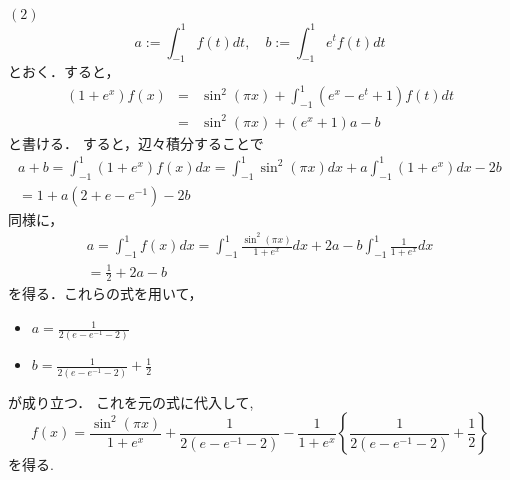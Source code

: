 \documentclass[main]{subfiles}
\begin{document}
\begin{pf}
$(2)$
\begin{equation*}
a := \int^1_{-1}f(t)dt, \quad b := \int^1_{-1}e^tf(t)dt
\end{equation*}
とおく．すると，
\begin{eqnarray*}
(1+e^x)f(x) &=& \sin^2(\pi x)+\int^1_{-1}(e^x-e^t+1)f(t)dt \\
&=&\sin^2(\pi x)+(e^x+1)a - b
\end{eqnarray*}
と書ける．
すると，辺々積分することで
\begin{eqnarray*}
a + b = \int^1_{-1}(1+e^x)f(x)dx = \int^1_{-1}\sin^2(\pi x)dx 
											+ a \int^1_{-1}(1+e^x)dx -2b \\
= 1 + a(2 + e -e^{-1}) -2b
\end{eqnarray*}
同様に，
\begin{eqnarray*}
a = \int^1_{-1}f(x)dx = \int^1_{-1}\frac{\sin^2(\pi x)}{1+e^x}dx
									+ 2a -b\int^1_{-1}\frac{1}{1+e^x}dx \\
									= \frac{1}{2} + 2a - b
\end{eqnarray*}
を得る．これらの式を用いて，
\begin{itemize}
\item $a = \frac{1}{2(e-e^{-1}-2)}$ \\
\item $b = \frac{1}{2(e-e^{-1}-2)} + \frac{1}{2}$
\end{itemize}
が成り立つ．
これを元の式に代入して, 
\begin{equation*}
f(x) = \frac{\sin^2(\pi x)}{1+e^x} + \frac{1}{2(e-e^{-1}-2)} 
	- \frac{1}{1+e^x} \left\{ \frac{1}{2(e-e^{-1}-2)} + \frac{1}{2} \right\}
\end{equation*}
を得る.
\end{pf}
\begin{prob}

\end{prob}
\end{document}
